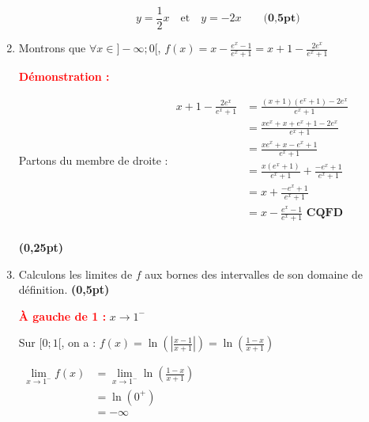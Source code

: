 \documentclass[12pt,a4paper]{article}
\begin{document}
\begin{enumerate}
\begin{enumerate}
                    \begin{resultbox}
                        \[
                            y = \frac{1}{2}x \quad \text{et} \quad y = -2x \quad\quad \textbf{(0,5pt)}
                        \]
                    \end{resultbox}

          \end{enumerate}

    \item Montrons que \( \forall x \in ]-\infty ; 0[ \), \( f(x) = x - \frac{e^x - 1}{e^x + 1} = x + 1 - \frac{2e^x}{e^x + 1} \)

          \textcolor{red}{\textbf{Démonstration :}}

          Partons du membre de droite :
          \(
            \begin{aligned}
                x + 1 - \frac{2e^x}{e^x + 1}&= \frac{(x + 1)(e^x + 1) - 2e^x}{e^x + 1}\\
                                            &= \frac{x e^x + x + e^x + 1
                                            - 2e^x}{e^x + 1}\\
                                            &=\frac{x e^x + x - e^x + 1}{e^x + 1}\\
                                            &=\frac{x(e^x + 1)}{e^x + 1}+\frac{- e^x + 1}{e^x + 1}\\
                                            &=x+\frac{- e^x + 1}{e^x + 1}\\
                                            &=x-\frac{ e^x - 1}{e^x + 1} \textbf{ CQFD}\\
            \end{aligned}
         \)

         \hfill \textbf{(0,25pt)}

         \item Calculons les limites de \( f \) aux bornes des intervalles de son domaine de définition. \hfill \textbf{(0,5pt)}

\textcolor{red}{\textbf{À gauche de 1 :}} \( x \to 1^- \)

Sur \( [0 ; 1[ \), on a : \( f(x) = \ln\left( \left| \frac{x - 1}{x + 1} \right| \right) = \ln\left( \frac{1 - x}{x + 1} \right) \)

\(
\begin{aligned}
    \lim\limits_{x \to 1^-} f(x) &= \lim\limits_{x \to 1^-} \ln\left( \frac{1 - x}{x + 1} \right)\\
                                &= \ln(0^+)\\
                                & = -\infty
\end{aligned}
\)


\end{enumerate}
\end{document}
